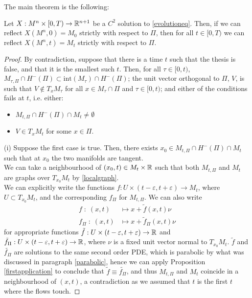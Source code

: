 The main theorem is the following: 

\begin{theorem}[Chow]
	Let $X:M^n\times [0,T) \rightarrow \mathbb{R}^{n+1}$ be a $C^2$ solution to \ref{evolutioneq}. Then, if we can reflect $X(M^n, 0)=M_0$ strictly with respect to $\Pi$, then for all $t\in [0,T)$ we can reflect $X(M^n, t)=M_t$ strictly with respect to $\Pi$. \label{reflection} 
\end{theorem}

\begin{proof}
	By contradiction, suppose that there is a time $t$ such that the thesis is false, and that it is the smallest such $t$. Then, for all $\tau \in [0,t)$, $M_{\tau,\Pi}\cap H^-(\Pi)\subset \mathrm{int}(M_{\tau})\cap H^-(\Pi)$; the unit vector orthogonal to $\Pi$, $V$, is such that $V\notin T_xM_\tau$ for all $x\in M_\tau\cap \Pi$ and $\tau \in [0,t)$; and either of the conditions fails at $t$, i.e. either: 
	\begin{itemize}
		\item[(i)] $M_{t,\Pi}\cap H^-(\Pi)\cap M_{t}\neq \emptyset$
		\item[(ii)] $V\in T_xM_t$  for some $x\in\Pi$. 
	\end{itemize} 
	
	(i) Suppose the first case is true. Then, there exists $x_0 \in M_{t,\Pi}\cap H^-(\Pi)\cap M_{t}$ such that at $x_0$ the two manifolds are tangent. \\
	We can take a neighbourhood of $(x_0, t)\in M_{t}\times \mathbb{R}$ such that  both $M_{t,\Pi}$ and $M_{t}$ are graphs over $T_{x_0}M_{t}$ by \ref{localgraph}. \\
	We can explicitly write the functions $f:U\times (t-\varepsilon, t+\varepsilon)\rightarrow M_t$, where $U\subset T_{x_0}M_{t}$, and the corresponding $f_\Pi$ for $M_{t,\Pi}$. 
	We can also write 
	\begin{align*}
		f \; : \; (x, t) &\mapsto x+\tilde{f}(x, t)\nu \\
		f_\Pi \; : \; (x, t) &\mapsto x+\tilde{f}_\Pi(x, t)\nu 
	\end{align*}
	for appropriate functions $\tilde{f}:U\times (t-\varepsilon, t+\varepsilon)\rightarrow \mathbb{R}$ and $\tilde{f}_\Pi:U\times (t-\varepsilon, t+\varepsilon)\rightarrow \mathbb{R}$, where $\nu$ is a fixed unit vector normal to $T_{x_0}M_{t}$.  $\tilde{f}$ and $\tilde{f_\Pi}$ are solutions to the same second order PDE, which is parabolic by what was discussed in paragraph \ref{parabolic}, hence we can apply Proposition \ref{firstapplication} to conclude that $\tilde{f}\equiv\tilde{f_\Pi}$, and thus $M_{t,\Pi}$ and $M_{t}$ coincide in a neighbourhood of $(x, t)$, a contradiction as we assumed that $t$ is the first $t$ where the flows touch.
	

\end{proof}
